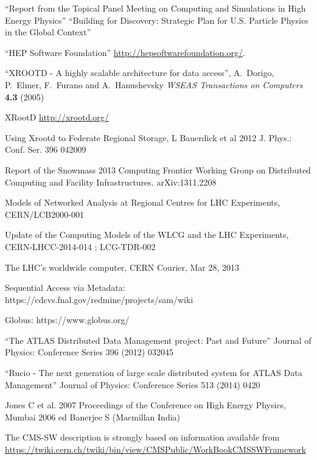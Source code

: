 \begin{thebibliography}{99}
 ``Report from the Topical Panel Meeting on Computing and
Simulations in High Energy Physics''
 ``Building for Discovery: Strategic Plan for U.S. Particle Physics in the Global Context''

 ``HEP Software Foundation'' \url{http://hepsoftwarefoundation.org/}.

 ``XROOTD - A highly scalable architecture for data access'', A.\ Dorigo, P.\ Elmer, F.\ Furano and A.\ Hanushevsky {\it WSEAS Transactions on Computers} {\bf 4.3} (2005)

 XRootD \url{http://xrootd.org/}

 Using Xrootd to Federate Regional Storage, L Bauerdick et al 2012 J. Phys.: Conf. Ser. 396 042009

 Report of the Snowmass 2013 Computing Frontier Working Group on Distributed Computing and Facility Infrastructures. arXiv:1311.2208

 Models of Networked Analysis at Regional Centres for LHC Experiments, CERN/LCB2000-001

 Update of the Computing Models of the WLCG and the LHC Experiments, CERN-LHCC-2014-014 ; LCG-TDR-002

 The LHC’s worldwide computer, CERN Courier, Mar 28, 2013

 Sequential Access via Metadata: https://cdcvs.fnal.gov/redmine/projects/sam/wiki

 Globus: https://www.globus.org/

 ``The ATLAS Distributed Data Management project: Past and Future'' Journal of Physics: Conference Series 396 (2012) 032045

 ``Rucio - The next generation of large scale distributed system for ATLAS Data Management'' Journal of Physics: Conference Series 513 (2014) 0420


 Jones C et al. 2007 Proceedings of the Conference on High Energy Physics, Mumbai 2006 ed Banerjee S (Macmillan India)

 The CMS-SW description is strongly based on information available from \url{https://twiki.cern.ch/twiki/bin/view/CMSPublic/WorkBookCMSSWFramework}


\end{thebibliography}
